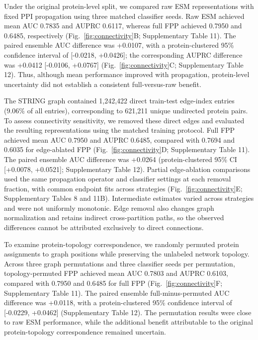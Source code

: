 \documentclass[conference]{IEEEtran}
\begin{document}
Under the original protein-level split, we compared raw ESM representations with fixed PPI propagation using three matched classifier seeds. Raw ESM achieved mean AUC 0.7835 and AUPRC 0.6117, whereas full FPP achieved 0.7950 and 0.6485, respectively (Fig.~\ref{fig:connectivity}B; Supplementary Table 11). The paired ensemble AUC difference was +0.0107, with a protein-clustered 95\% confidence interval of [-0.0218, +0.0426]; the corresponding AUPRC difference was +0.0412 [-0.0106, +0.0767] (Fig.~\ref{fig:connectivity}C; Supplementary Table 12). Thus, although mean performance improved with propagation, protein-level uncertainty did not establish a consistent full-versus-raw benefit.

The STRING graph contained 1,242,422 direct train-test edge-index entries (9.06\% of all entries), corresponding to 621,211 unique undirected protein pairs. To assess connectivity sensitivity, we removed these direct edges and evaluated the resulting representations using the matched training protocol. Full FPP achieved mean AUC 0.7950 and AUPRC 0.6485, compared with 0.7694 and 0.6035 for edge-ablated FPP (Fig.~\ref{fig:connectivity}D; Supplementary Table 11). The paired ensemble AUC difference was +0.0264 (protein-clustered 95\% CI [+0.0078, +0.0521]; Supplementary Table 12). Partial edge-ablation comparisons used the same propagation operator and classifier settings at each removal fraction, with common endpoint fits across strategies (Fig.~\ref{fig:connectivity}E; Supplementary Tables 8 and 11B). Intermediate estimates varied across strategies and were not uniformly monotonic. Edge removal also changes graph normalization and retains indirect cross-partition paths, so the observed differences cannot be attributed exclusively to direct connections.

To examine protein-topology correspondence, we randomly permuted protein assignments to graph positions while preserving the unlabeled network topology. Across three graph permutations and three classifier seeds per permutation, topology-permuted FPP achieved mean AUC 0.7803 and AUPRC 0.6103, compared with 0.7950 and 0.6485 for full FPP (Fig.~\ref{fig:connectivity}F; Supplementary Table 11). The paired ensemble full-minus-permuted AUC difference was +0.0118, with a protein-clustered 95\% confidence interval of [-0.0229, +0.0462] (Supplementary Table 12). The permutation results were close to raw ESM performance, while the additional benefit attributable to the original protein-topology correspondence remained uncertain.
\end{document}
